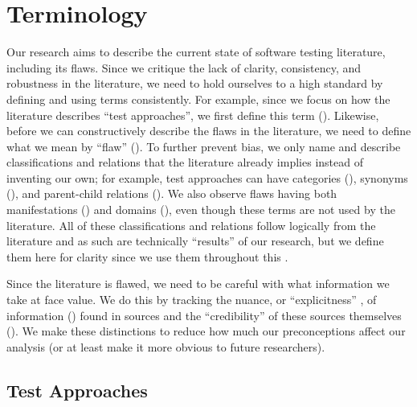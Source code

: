 \section{Terminology}\label{terminology}

Our research aims to describe the current state of software testing literature,
including its flaws. Since we critique the lack of clarity, consistency, and
robustness in the literature, we need to hold ourselves to a high
standard by defining and using terms consistently. For example, since we focus
on how the literature describes ``test approaches'', we first define this term
(). Likewise, before we can constructively describe
the flaws in the literature, we need to define what we mean by ``flaw''
(). To further prevent bias, we only name and describe
classifications and relations that the literature already implies instead of
inventing our own; for example, test approaches can have categories
(), synonyms (), and parent-child relations
(). We also observe flaws having both manifestations
() and domains (), even
though these terms are not used by the literature. All of these classifications
and relations follow logically from the literature and as such are technically
``results'' of our research, but we define them here for clarity since we use
them throughout this \docType{}.

Since the literature is flawed, we need to be careful with what information we
take at face value. We do this by tracking the nuance, or ``explicitness''%
, of information () found in sources and
the ``credibility'' of these sources themselves (). We make these
distinctions to reduce how much our preconceptions affect our analysis (or at
least make it more obvious to future researchers).

\subsection{Test Approaches}\label{approach-def}


